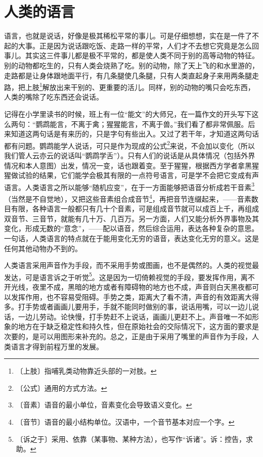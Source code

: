 \documentclass[12pt,UTF-8,openany]{ctexbook}
\begin{document}
\chapter{人类的语言}

\begin{large}
    
    语言，也就是说话，好像是极其稀松平常的事儿。可是仔细想想，实在是一件了不起的大事。正是因为说话跟吃饭、走路一样的平常，人们才不去想它究竟是怎么回事儿。其实这三件事儿都是极不平常的，都是使人类不同于别的高等动物的特征。别的动物都吃生的，只有人类会烧熟了吃。别的动物，除了天上飞的和水里游的，走路都是让身体跟地面平行，有几条腿使几条腿，只有人类直起身子来用两条腿走路，把上肢\footnote{〔上肢〕指哺乳类动物靠近头部的一对肢。}解放出来干别的、更重要的活儿。同样，别的动物的嘴只会吃东西，人类的嘴除了吃东西还会说话。
    
    记得在小学里读书的时候，班上有一位“能文”的大师兄，在一篇作文的开头写下这么两句：“鹦鹉能言，不离于禽；猩猩能言，不离于兽。”我们看了都非常佩服。后来知道这两句话是有来历的，只是字句有些出入。又过了若干年，才知道这两句话都有问题。鹦鹉能学人说话，可只是作为现成的公式\footnote{〔公式〕通用的方式方法。}来说，不会加以变化（所以我们管人云亦云的说话叫“鹦鹉学舌”）。只有人们的说话是从具体情况（包括外界情况和本人意图）出发，情况一变，话也跟着变。至于猩猩，根据西方学者拿黑猩猩做试验的结果，它们能学会极其有限的一点符号语言，可是学不会把它变成有声语言。人类语言之所以能够“随机应变”，在于一方面能够把语音分析成若干音素\footnote{〔音素〕语音的最小单位，音素变化会导致语义变化。}（当然是不自觉地），又把这些音素组合成音节\footnote{〔音节〕语音的最小结构单位。汉语中，一个音节基本对应一个字。}，再把音节连缀起来，——音素数目有限，各种语言一般都只有几十个音素，可是组成音节就可以成百上千，再组成双音节、三音节，就能有几十万、几百万。另一方面，人们又能分析外界事物及其变化，形成无数的“意念”，——配以语音，然后综合运用，表达各种复杂的意思。一句话，人类语言的特点就在于能用变化无穷的语音，表达变化无穷的意义。这是任何其他动物办不到的。
    
    人类语言采用声音作为手段，而不采用手势或图画，也不是偶然的。人类的视觉最发达，可是语言诉之于听觉\footnote{〔诉之于〕采用、依靠（某事物、某种方法），也写作“诉诸”。诉：控告，求助。}。这是因为一切倚赖视觉的手段，要发挥作用，离不开光线，夜里不成，黑暗的地方或者有障碍物的地方也不成，声音则白天黑夜都可以发挥作用，也不容易受阻碍。手势之类，距离大了看不清，声音的有效距离大得多。打手势或者画画儿要用手，手就不能同时做别的事，说话用嘴，可以一边儿说话，一边儿劳动。论快慢，打手势赶不上说话，画画儿更赶不上。声音唯一不如形象的地方在于缺乏稳定性和持久性，但在原始社会的交际情况下，这方面的要求是次要的，是可以用图形来补充的。总之，正是由于采用了嘴里的声音作为手段，人类语言才得到前程万里的发展。
    
\end{large}
\end{document}
